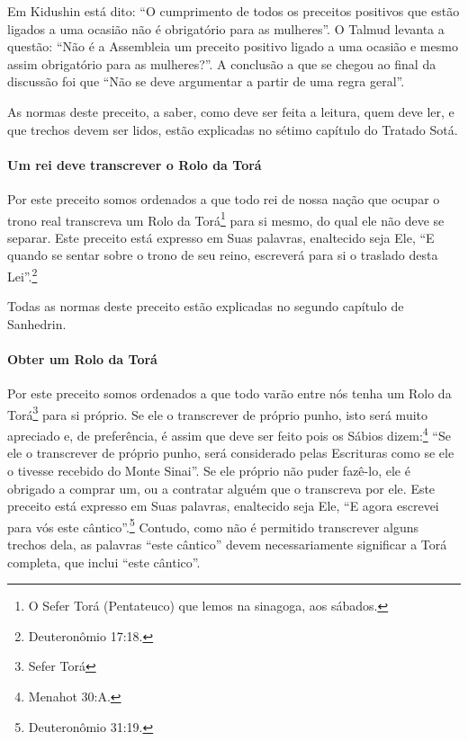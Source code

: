 Em Kidushin está dito: ``O cumprimento de todos os preceitos positivos
que estão ligados a uma ocasião não é obrigatório para as mulheres''. O
Talmud levanta a questão: ``Não é a Assembleia um preceito positivo
ligado a uma ocasião e mesmo assim obrigatório para as mulheres?''. A
conclusão a que se chegou ao final da discussão foi que ``Não se deve
argumentar a partir de uma regra geral''.

As normas deste preceito, a saber, como deve ser feita a leitura, quem
deve ler, e que trechos devem ser lidos, estão explicadas no sétimo
capítulo do Tratado Sotá.

\paragraph{Um rei deve transcrever o Rolo da Torá}

Por este preceito somos ordenados a que todo rei de nossa nação que
ocupar o trono real transcreva um Rolo da Torá\footnote{O Sefer Torá (Pentateuco) que lemos na sinagoga, aos sábados.}
para si mesmo, do qual ele não deve se separar. Este preceito está
expresso em Suas palavras, enaltecido seja Ele, ``E quando se sentar
sobre o trono de seu reino, escreverá para si o traslado desta Lei''.\footnote{Deuteronômio 17:18.}

Todas as normas deste preceito estão explicadas no segundo capítulo de
Sanhedrin.

\paragraph{Obter um Rolo da Torá}

Por este preceito somos ordenados a que todo varão entre nós tenha um Rolo da Torá\footnote{Sefer Torá} para si próprio. Se ele o transcrever de próprio punho, isto será muito apreciado e, de preferência, é assim que deve ser feito
pois os Sábios dizem:\footnote{Menahot 30:A.} ``Se ele o transcrever de
próprio punho, será considerado pelas Escrituras como se ele o tivesse recebido do Monte Sinai''. Se ele
próprio não puder fazê-lo, ele é obrigado a comprar um, ou a contratar
alguém que o transcreva por ele. Este preceito está expresso em Suas palavras,
enaltecido seja Ele, ``E agora escrevei para vós este cântico''.\footnote{Deuteronômio 31:19.} Contudo, como não é permitido transcrever alguns
trechos dela, as palavras ``este cântico'' devem necessariamente
significar a Torá completa, que inclui ``este cântico''.

